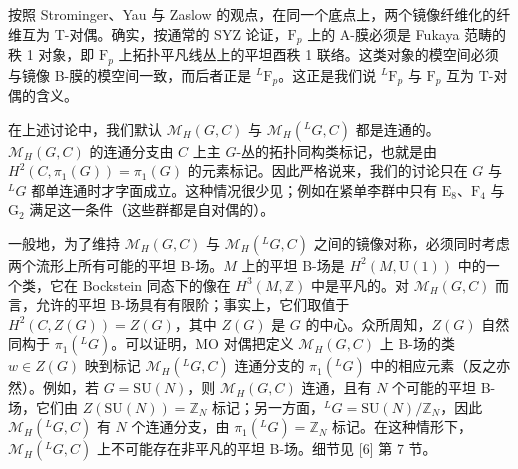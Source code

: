 \documentclass[11pt,a4paper,UTF8]{ctexart}
\begin{document}
按照 Strominger、Yau 与 Zaslow 的观点，在同一个底点上，两个镜像纤维化的纤维互为 T-对偶。确实，按通常的 SYZ 论证，$\mathrm{F}_{p}$ 上的 A-膜必须是 Fukaya 范畴的秩 1 对象，即 $\mathrm{F}_{p}$ 上拓扑平凡线丛上的平坦酉秩 1 联络。这类对象的模空间必须与镜像 B-膜的模空间一致，而后者正是 ${}^{L}\mathrm{F}_{p}$。这正是我们说 ${}^{L}\mathrm{F}_{p}$ 与 $\mathrm{F}_{p}$ 互为 T-对偶的含义。



在上述讨论中，我们默认 $\mathcal{M}_{H}(G,C)$ 与 $\mathcal{M}_{H}({}^{L}G,C)$ 都是连通的。$\mathcal{M}_{H}(G,C)$ 的连通分支由 $C$ 上主 $G$-丛的拓扑同构类标记，也就是由 $H^{2}(C,\pi_{1}(G))=\pi_{1}(G)$ 的元素标记。因此严格说来，我们的讨论只在 $G$ 与 ${}^{L}G$ 都单连通时才字面成立。这种情况很少见；例如在紧单李群中只有 $\mathrm{E}_{8}$、$\mathrm{F}_{4}$ 与 $\mathrm{G}_{2}$ 满足这一条件（这些群都是自对偶的）。

一般地，为了维持 $\mathcal{M}_{H}(G,C)$ 与 $\mathcal{M}_{H}({}^{L}G,C)$ 之间的镜像对称，必须同时考虑两个流形上所有可能的平坦 B-场。$M$ 上的平坦 B-场是 $H^{2}(M,\mathrm{U}(1))$ 中的一个类，它在 Bockstein 同态下的像在 $H^{3}(M,\mathbb{Z})$ 中是平凡的。对 $\mathcal{M}_{H}(G,C)$ 而言，允许的平坦 B-场具有有限阶；事实上，它们取值于 $H^{2}(C,Z(G))=Z(G)$，其中 $Z(G)$ 是 $G$ 的中心。众所周知，$Z(G)$ 自然同构于 $\pi_{1}({}^{L}G)$。可以证明，MO 对偶把定义 $\mathcal{M}_{H}(G,C)$ 上 B-场的类 $w\in Z(G)$ 映到标记 $\mathcal{M}_{H}({}^{L}G,C)$ 连通分支的 $\pi_{1}({}^{L}G)$ 中的相应元素（反之亦然）。例如，若 $G=\mathrm{SU}(N)$，则 $\mathcal{M}_{H}(G,C)$ 连通，且有 $N$ 个可能的平坦 B-场，它们由 $Z(\mathrm{SU}(N))=\mathbb{Z}_{N}$ 标记；另一方面，${}^{L}G=\mathrm{SU}(N)/\mathbb{Z}_{N}$，因此 $\mathcal{M}_{H}({}^{L}G,C)$ 有 $N$ 个连通分支，由 $\pi_{1}({}^{L}G)=\mathbb{Z}_{N}$ 标记。在这种情形下，$\mathcal{M}_{H}({}^{L}G,C)$ 上不可能存在非平凡的平坦 B-场。细节见 [6] 第 7 节。

\end{document}
